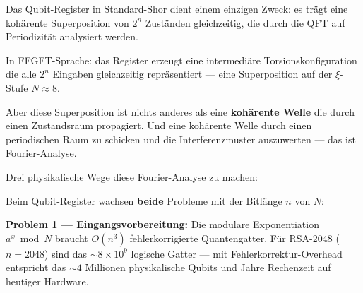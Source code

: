 \begin{foundation}
Das Qubit-Register in Standard-Shor dient einem
einzigen Zweck: es trägt eine kohärente Superposition
von $2^n$ Zuständen gleichzeitig, die durch die QFT
auf Periodizität analysiert werden.

In FFGFT-Sprache: das Register erzeugt eine
intermediäre Torsionskonfiguration die alle
$2^n$ Eingaben gleichzeitig repräsentiert ---
eine Superposition auf der $\xi$-Stufe $N \approx 8$.

Aber diese Superposition ist nichts anderes als
eine \textbf{kohärente Welle} die durch einen
Zustandsraum propagiert.
Und eine kohärente Welle durch einen periodischen
Raum zu schicken und die Interferenzmuster
auszuwerten --- das ist Fourier-Analyse.

Drei physikalische Wege diese Fourier-Analyse zu machen:

\begin{center}
\end{center}

\begin{important}
Beim Qubit-Register wachsen \textbf{beide} Probleme
mit der Bitlänge $n$ von $N$:

\textbf{Problem 1 --- Eingangsvorbereitung:}
Die modulare Exponentiation $a^x \bmod N$
braucht $O(n^3)$ fehlerkorrigierte Quantengatter.
Für RSA-2048 ($n = 2048$) sind das
$\sim 8 \times 10^9$ logische Gatter ---
mit Fehlerkorrektur-Overhead entspricht das
$\sim 4$ Millionen physikalische Qubits
und Jahre Rechenzeit auf heutiger Hardware.


\end{important}
\end{foundation}
